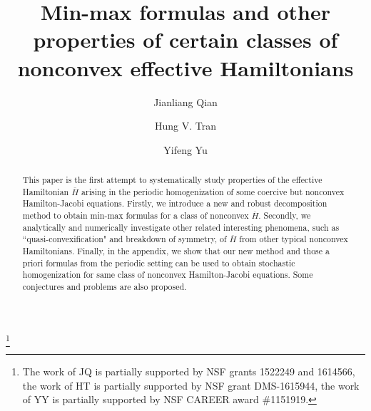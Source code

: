 \documentclass[12pt,reqno]{amsart}
\theoremstyle{plain}
\theoremstyle{remark}
\numberwithin{equation}{section}
\newcommand{\ol}{\overline}
\begin{document}
\title[Min-max formulas  and other properties of $\ol{H}$]{Min-max formulas  and other properties of certain classes of nonconvex effective Hamiltonians}


\author{Jianliang Qian}
\address[Jianliang Qian]
{
Department of Mathematics and Department of Computational Mathematics, Science and Engineering, 
Michigan State University, East Lansing, MI 48824 , USA}

\author{Hung V. Tran}
\address[Hung V. Tran]
{
Department of Mathematics, 
University of Wisconsin Madison, Van Vleck hall, 480 Lincoln drive, Madison, WI 53706, USA}

\author{Yifeng Yu}
\address[Yifeng Yu]
{
Department of Mathematics, 
University of California, Irvine, 410G Rowland Hall, Irvine, CA 92697, USA}

\thanks{
The  work of JQ is partially supported by NSF grants 1522249 and 1614566,
the work of HT is partially supported by NSF grant DMS-1615944,
the work of YY is partially supported by NSF CAREER award \#1151919.
}

\date{}


\maketitle 

\begin{abstract}
This paper is the first attempt to systematically study properties of the effective Hamiltonian $\ol{H}$  arising in the  periodic homogenization of some  coercive but nonconvex Hamilton-Jacobi equations.  Firstly,  we introduce a new and robust decomposition method to obtain min-max formulas for a class of nonconvex $\ol{H}$.  
Secondly,  we   analytically and numerically investigate other related interesting  phenomena, such as ``quasi-convexification" and breakdown of symmetry, of $\ol{H}$ from other typical nonconvex Hamiltonians.  
Finally,  in the appendix, we show that our new method and those a priori formulas from the periodic setting can be used to obtain stochastic homogenization  for same class of nonconvex Hamilton-Jacobi equations.  Some conjectures and problems are also proposed. 
\end{abstract}
\end{document}

